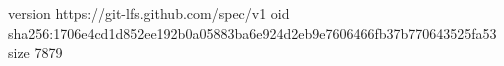 version https://git-lfs.github.com/spec/v1
oid sha256:1706e4cd1d852ee192b0a05883ba6e924d2eb9e7606466fb37b770643525fa53
size 7879
